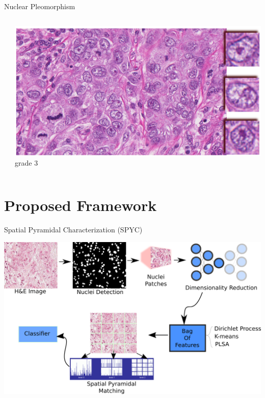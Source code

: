 \documentclass[usenames,dvipsnames]{beamer}
\begin{document}
\begin{frame}{Nuclear Pleomorphism}
{\begin{columns}
\begin{column}{0.33\textwidth}
\end{column}

\begin{column}{0.33\textwidth}
\includegraphics[width=\textwidth]{imagenes/grado3.png}
\\\centering \scriptsize grade 3

\end{column}

\end{columns}
      
  }
\end{frame}


\section{Proposed Framework}
\begin{frame}{Spatial Pyramidal Characterization (SPYC)}

\includegraphics[width=\textwidth]{imagenes_cnn/metodonuevo.png}
    
\end{frame}
\end{document}
